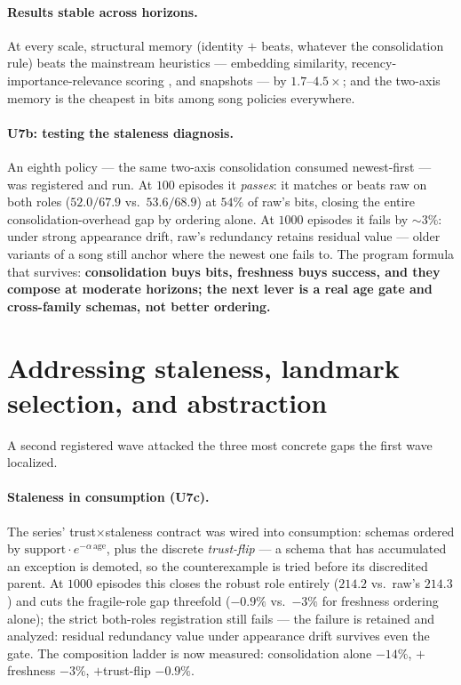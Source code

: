 \documentclass{article}
\begin{document}
\paragraph{Results stable across horizons.} At every scale, structural memory
(identity $+$ beats, whatever the consolidation rule) beats the
mainstream heuristics --- embedding similarity, recency-importance-relevance
scoring \citep{genagents2023,memgas2025}, and snapshots --- by
$1.7$--$4.5\times$; and the two-axis memory is the cheapest in bits
among song policies everywhere.

\paragraph{U7b: testing the staleness diagnosis.} An eighth policy
--- the same two-axis consolidation consumed newest-first --- was
registered and run. At $100$ episodes it \emph{passes}: it matches or
beats raw on both roles ($52.0/67.9$ vs.\ $53.6/68.9$) at $54\%$ of
raw's bits, closing the entire consolidation-overhead gap by
ordering alone. At $1000$ episodes it fails by $\sim 3\%$: under
strong appearance drift, raw's redundancy retains residual value ---
older variants of a song still anchor where the newest one fails to.
The program formula that survives: \textbf{consolidation buys bits,
freshness buys success, and they compose at moderate horizons; the
next lever is a real age gate and cross-family schemas, not better
ordering.}


\section{Addressing staleness, landmark selection, and abstraction}
\label{p5:sec:gaps}

A second registered wave attacked the three most concrete gaps the
first wave localized.

\paragraph{Staleness in consumption (U7c).} The series'
trust$\times$staleness contract was wired into consumption: schemas
ordered by $\text{support}\cdot e^{-\alpha\,\text{age}}$, plus the
discrete \emph{trust-flip} --- a schema that has accumulated an
exception is demoted, so the counterexample is tried before its
discredited parent. At $1000$ episodes this closes the robust role
entirely ($214.2$ vs.\ raw's $214.3$) and cuts the fragile-role gap
threefold ($-0.9\%$ vs.\ $-3\%$ for freshness ordering alone); the
strict both-roles registration still fails --- the failure is retained
and analyzed: residual
redundancy value under appearance drift survives even the gate. The
composition ladder is now measured: consolidation alone $-14\%$,
$+$freshness $-3\%$, $+$trust-flip $-0.9\%$.
\end{document}
